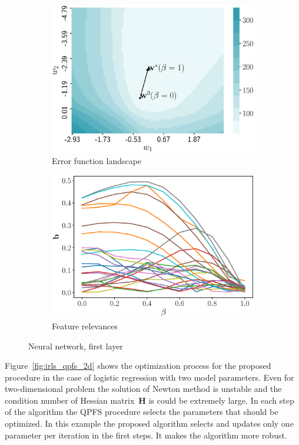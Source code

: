 \documentclass[a4paper,12pt]{article}
\theoremstyle{plain} %
\theoremstyle{definition} %
\theoremstyle{remark} %
\newcommand{\bH}{\mathbf{H}}
\begin{document}
  \begin{figure}[!h]
  	\centering
  	\begin{subfigure}{.5\textwidth}
  		\centering
  		\includegraphics[width=\linewidth]{figs/neural_error.eps}
  		\caption{Error function landscape}
  		\label{fig:neural_error}
  	\end{subfigure}%
  	\begin{subfigure}{.5\textwidth}
  		\centering
  		\includegraphics[width=\linewidth]{figs/neural_b_wrt_beta.eps}
  		\caption{Feature relevances}
  		\label{fig:neural_b_wrt_beta}
  	\end{subfigure}
  	\caption{Neural network, first layer}
  \end{figure}

	Figure~\ref{fig:irls_qpfs_2d} shows the optimization process for the proposed procedure in the case of logistic regression with two model parameters. 
	Even for two-dimensional problem the solution of Newton method is unstable and the condition number of Hessian matrix~$\bH$ is could be extremely large. 
	In each step of the algorithm the QPFS procedure selects the parameters that should be optimized. 
	In this example the proposed algorithm selects and updates only one parameter per iteration in the first steps. 
	It makes the algorithm more robust.
	
\end{document}
